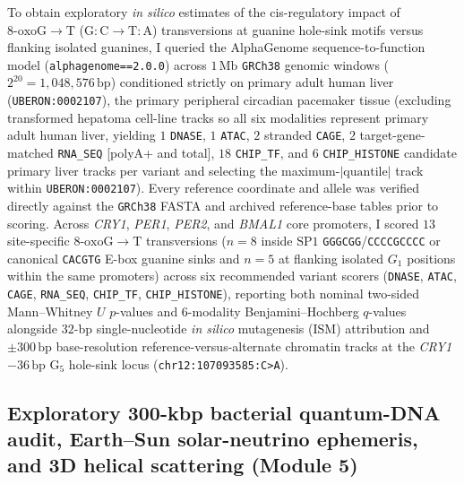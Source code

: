 \documentclass[10pt,letterpaper]{article}
\theoremstyle{plain}
\theoremstyle{definition}
\newcommand{\oxog}{\text{8-oxoG}}
\begin{document}
To obtain exploratory \emph{in silico} estimates of the cis-regulatory impact of $\oxog \to \mathrm{T}$ ($\mathrm{G{:}C \to T{:}A}$) transversions at guanine hole-sink motifs versus flanking isolated guanines, I queried the AlphaGenome sequence-to-function model (\texttt{alphagenome==2.0.0}) across $1\,\mathrm{Mb}$ \texttt{GRCh38} genomic windows ($2^{20} = 1{,}048{,}576\,\mathrm{bp}$) conditioned strictly on primary adult human liver (\texttt{UBERON:0002107}), the primary peripheral circadian pacemaker tissue (excluding transformed hepatoma cell-line tracks so all six modalities represent primary adult human liver, yielding $1$ \texttt{DNASE}, $1$ \texttt{ATAC}, $2$ stranded \texttt{CAGE}, $2$ target-gene-matched \texttt{RNA\_SEQ} [polyA+ and total], $18$ \texttt{CHIP\_TF}, and $6$ \texttt{CHIP\_HISTONE} candidate primary liver tracks per variant and selecting the maximum-$|\text{quantile}|$ track within \texttt{UBERON:0002107}). Every reference coordinate and allele was verified directly against the \texttt{GRCh38} FASTA and archived reference-base tables prior to scoring. Across \emph{CRY1}, \emph{PER1}, \emph{PER2}, and \emph{BMAL1} core promoters, I scored $13$ site-specific $\oxog \to \mathrm{T}$ transversions ($n=8$ inside $\mathrm{SP1}$ \texttt{GGGCGG}/\texttt{CCCCGCCCC} or canonical \texttt{CACGTG} E-box guanine sinks and $n=5$ at flanking isolated $G_1$ positions within the same promoters) across six recommended variant scorers (\texttt{DNASE}, \texttt{ATAC}, \texttt{CAGE}, \texttt{RNA\_SEQ}, \texttt{CHIP\_TF}, \texttt{CHIP\_HISTONE}), reporting both nominal two-sided Mann--Whitney $U$ $p$-values and $6$-modality Benjamini--Hochberg $q$-values alongside $32$-bp single-nucleotide \emph{in silico} mutagenesis (ISM) attribution and $\pm 300\,\mathrm{bp}$ base-resolution reference-versus-alternate chromatin tracks at the \emph{CRY1} $-36\,\mathrm{bp}$ $\mathrm{G}_5$ hole-sink locus (\texttt{chr12:107093585:C>A}).

\subsection*{Exploratory 300-kbp bacterial quantum-DNA audit, Earth--Sun solar-neutrino ephemeris, and 3D helical scattering (Module 5)}
\end{document}
